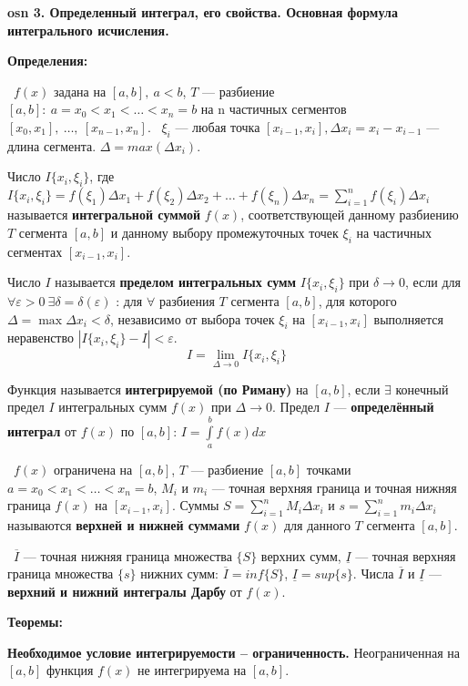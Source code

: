 \textbf{\LARGE osn 3. Определенный интеграл, его свойства. Основная формула интегрального исчисления.}

\textbf{Определения:}

\mathLet \ $f(x)$ задана на $[a,b],~a<b$, $T$ --- разбиение $[a,b]:~a=x_0 < x_1 < \dots < x_n = b$ на n частичных сегментов $[x_0,x_1],~\dots,~[x_{n-1},x_n]$. \mathLet \ $\xi_i$  --- любая точка $[x_{i-1}, x_i], \Delta x_i = x_i - x_{i-1}$ --- длина сегмента. $\Delta = max(\Delta x_i)$.

\bigbreak
Число $I\{x_i, \xi_i\}$, где
$I\{x_i,\xi_i\} = f(\xi_1) \Delta x_1 + f(\xi_2) \Delta x_2 + \dots + f(\xi_n) \Delta x_n = \displaystyle\sum_{i=1}^n f(\xi_i) \Delta x_i$ называется \textbf{интегральной суммой} $f(x)$, соответствующей данному разбиению $T$ сегмента $[a, b]$ и данному выбору промежуточных точек $\xi_i$ на частичных сегментах $[x_{i-1}, x_i]$.

\bigbreak
Число $I$ называется \textbf{пределом интегральных сумм} $I\{x_i, \xi_i\}$ при $\delta \to 0$, если для $\forall \varepsilon > 0~\exists \delta = \delta(\varepsilon)$ : для $\forall$ разбиения $T$ сегмента $[a, b]$, для которого $\Delta  = \max \Delta x_i < \delta$, независимо от выбора точек $\xi_i$ на $[x_{i-1}, x_i]$ выполняется неравенство $|I\{x_i, \xi_i\} - I| < \varepsilon$.
$$I = \lim\limits_{\Delta \to 0} I\{x_i,\xi_i\} $$

\bigbreak
Функция называется \textbf{интегрируемой (по Риману)} на $[a, b]$, если $\exists$ конечный предел $I$ интегральных сумм $f(x)$ при $\Delta \to 0$. Предел $I$ --- \textbf{определённый интеграл} от $f(x)$ по $[a,b]$: $I = \int\limits_a^b f(x)dx$

\bigbreak
\mathLet \ $f(x)$ ограничена на $[a, b]$, $T$ --- разбиение $[a, b]$ точками $a = x_0 < x_1 < \dots < x_n = b$, $M_i$ и $m_i$ --- точная верхняя граница и точная нижняя граница $f(x)$ на $[x_{i-1}, x_i]$. Суммы $S = \sum_{i=1}^n M_i\Delta x_i$ и $s = \sum_{i=1}^n m_i\Delta x_i$ называются \textbf{верхней и нижней суммами} $f(x)$ для данного $T$ сегмента $[a,b]$.

\bigbreak
\mathLet \ $\overline{I}$ --- точная нижняя граница множества $\{S\}$ верхних сумм, $\underline{I}$ --- точная верхняя граница множества $\{s\}$ нижних сумм: $\overline{I} = inf\{S\}$, $\underline{I} = sup\{s\}$. Числа $\overline{I}$ и $\underline{I}$ --- \textbf{верхний и нижний интегралы Дарбу} от $f(x)$.

\bigbreak
\textbf{Теоремы:}

\textbf{Необходимое условие интегрируемости -- ограниченность.} Неограниченная на $[a, b]$ функция $f(x)$ не интегрируема на $[a, b]$.

